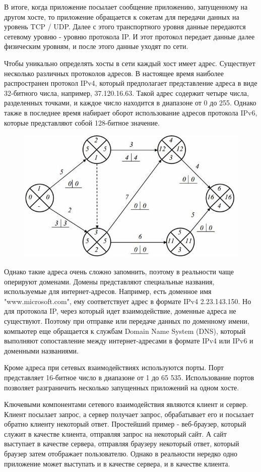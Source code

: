 \documentclass[a4paper, 12pt]{report}
\begin{document}
	В итоге, когда приложение посылает сообщение приложению, запущенному на другом хосте, то приложение обращается к сокетам для передачи данных на уровень TCP / UDP. Далее с этого транспортного уровня данные передаются сетевому уровню - уровню протокола IP. И этот протокол передает данные далее физическим уровням, и после этого данные уходят по сети.
	
	Чтобы уникально определять хосты в сети каждый хост имеет адрес. Существует несколько различных протоколов адресов. В настоящее время наиболее распространен протокол IPv4, который предполагает представление адреса в виде 32-битного числа, например, 37.120.16.63. Такой адрес содержит четыре числа, разделенных точками, и каждое число находится в диапазоне от 0 до 255. Однако также в последнее время набирает оборот использование адресов протокола IPv6, которые представляют собой 128-битное значение.
	
	\begin{figure}[h]
		
		\centering
		\includegraphics[width=0.5\linewidth]{image001.png}
		
	\end{figure}
	
	Однако такие адреса очень сложно запомнить, поэтому в реальности чаще оперируют доменами. Домены представляют специальные названия, используемые для интернет-адресов. Например, есть доменное имя "www.microsoft.com", ему соответствует адрес в формате IPv4 2.23.143.150. Но для протокола IP, через который идет взаимодействие, доменные адреса не существуют. Поэтому при отправке или передаче данных по доменному имени, компьютер еще обращается к службам Domain Name System (DNS), который выполняют сопоставление между интернет-адресами в формате IPv4 или IPv6 и доменными названиями.
	
	Кроме адреса при сетевых взаимодействиях используются порты. Порт представляет 16-битное число в диапазоне от 1 до 65 535. Использование портов позволяет разграничить несколько запущенных приложений на одном хосте.
	
	Ключевыми компонентами сетевого взаимодействия являются клиент и сервер. Клиент посылает запрос, а сервер получает запрос, обрабатывает его и посылает обратно клиенту некоторый ответ. Простейший пример - веб-браузер, который служит в качестве клиента, отправляя запрос на некоторый сайт. А сайт выступает в качестве сервера, отправляя браузеру некоторый ответ, который браузер затем отображает пользователю. Однако в реальности нередко одно приложение может выступать и в качестве сервера, и в качестве клиента. \cite{дубаков2013сетевое}
	
\end{document}
